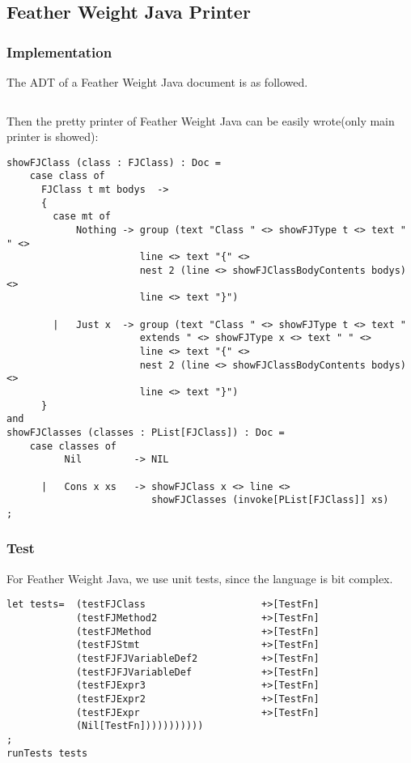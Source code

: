 \subsection{Feather Weight Java Printer}

\subsubsection{Implementation}
The ADT of a Feather Weight Java document is as followed.

\begin{lstlisting}

\end{lstlisting}

Then the pretty printer of Feather Weight Java can be easily wrote(only main printer is showed):

\begin{lstlisting}
showFJClass (class : FJClass) : Doc =
    case class of
      FJClass t mt bodys  ->
      {
        case mt of
            Nothing -> group (text "Class " <> showFJType t <> text " " <>
                       line <> text "{" <>
                       nest 2 (line <> showFJClassBodyContents bodys) <>
                       line <> text "}")

        |   Just x  -> group (text "Class " <> showFJType t <> text "
                       extends " <> showFJType x <> text " " <>
                       line <> text "{" <>
                       nest 2 (line <> showFJClassBodyContents bodys) <>
                       line <> text "}")
      }
and
showFJClasses (classes : PList[FJClass]) : Doc =
    case classes of
          Nil         -> NIL

      |   Cons x xs   -> showFJClass x <> line <>
                         showFJClasses (invoke[PList[FJClass]] xs)
;
\end{lstlisting}

\subsubsection{Test}

For Feather Weight Java, we use unit tests, since the language is bit complex.

\begin{lstlisting}
let tests=  (testFJClass                    +>[TestFn]
            (testFJMethod2                  +>[TestFn]
            (testFJMethod                   +>[TestFn]
            (testFJStmt                     +>[TestFn]
            (testFJFJVariableDef2           +>[TestFn]
            (testFJFJVariableDef            +>[TestFn]
            (testFJExpr3                    +>[TestFn]
            (testFJExpr2                    +>[TestFn]
            (testFJExpr                     +>[TestFn]
            (Nil[TestFn]))))))))))
;
runTests tests
\end{lstlisting}

